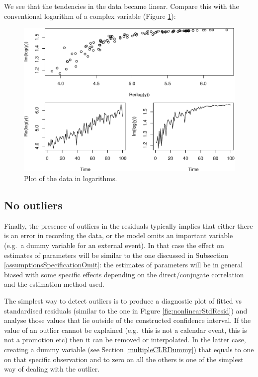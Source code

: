 \documentclass[
]{book}
\begin{document}
We see that the tendencies in the data became linear. Compare this with the conventional logarithm of a complex variable (Figure \ref{fig:nonlinearDataLog}):

\begin{figure}
\centering
\includegraphics{Svetunkov---Svetunkov---Complex-Valued-Econometrics_files/figure-latex/nonlinearDataLog-1.pdf}
\caption{\label{fig:nonlinearDataLog}Plot of the data in logarithms.}
\end{figure}

\hypertarget{assumptionsSpecificationOutlier}{%
\subsection{No outliers}\label{assumptionsSpecificationOutlier}}

Finally, the presence of outliers in the residuals typically implies that either there is an error in recording the data, or the model omits an important variable (e.g.~a dummy variable for an external event). In that case the effect on estimates of parameters will be similar to the one discussed in Subsection \ref{assumptionsSpecificationOmit}: the estimates of parameters will be in general biased with some specific effects depending on the direct/conjugate correlation and the estimation method used.

The simplest way to detect outliers is to produce a diagnostic plot of fitted vs standardised residuals (similar to the one in Figure \ref{fig:nonlinearStdResid}) and analyse those values that lie outside of the constructed confidence interval. If the value of an outlier cannot be explained (e.g.~this is not a calendar event, this is not a promotion etc) then it can be removed or interpolated. In the latter case, creating a dummy variable (see Section \ref{multipleCLRDummy}) that equals to one on that specific observation and to zero on all the others is one of the simplest way of dealing with the outlier.
\end{document}
